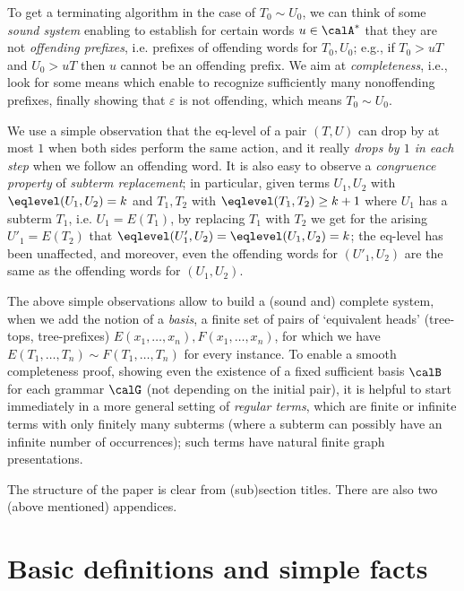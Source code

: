 \documentclass[12pt]{article}
\begin{document}
To get a
terminating algorithm in the case of $T_0\sim U_0$,
we can think of some \emph{sound system} enabling to establish for certain words
$u\in\calA^*$ that they are not \emph{offending prefixes}, i.e.
prefixes of offending words for  $T_0,U_0$; e.g., if $T_0\gt{u} T$
and $U_0\gt{u} T$ then $u$ cannot be an offending prefix.
We aim at \emph{completeness},
i.e., look for some means which enable to recognize sufficiently many
nonoffending prefixes, finally showing that $\varepsilon$ is not
offending, which means  $T_0\sim U_0$.

We use a simple observation that
the eq-level of a pair $(T,U)$ can drop by at most $1$ when both sides
perform the same
action, 
and it 
really \emph{drops by $1$ in each step} when we follow an offending
word.
It is also easy to observe a \emph{congruence property} of
\emph{subterm replacement}; in particular, given terms $U_1,U_2$ with 
$\eqlevel(U_1,U_2)=k$ and $T_1,T_2$ with  $\eqlevel(T_1,T_2)\geq k+1$
where $U_1$ has a subterm $T_1$, i.e. $U_1=E(T_1)$,
by replacing $T_1$ with $T_2$ we get for the arising $U'_1=E(T_2)$ 
that $\eqlevel(U'_1,U_2)=\eqlevel(U_1,U_2)=k$; 
the eq-level has been unaffected, and moreover, even the offending words for
$(U'_1,U_2)$ 
are
the same as the offending words for $(U_1,U_2)$. 

The above simple observations allow to build a (sound and) 
complete system,
when we add the notion of a \emph{basis}, a finite set of pairs of `equivalent heads'
(tree-tops, tree-prefixes)
$E(x_1,\dots,x_n), F(x_1,\dots,x_n)$, for which 
we have $E(T_1,\dots,T_n)\sim F(T_1,\dots,T_n)$ for every instance.
To enable a smooth completeness proof, showing
even the existence of a fixed sufficient basis
$\calB$ for each grammar $\calG$ (not depending on the initial pair),
it is helpful
to start immediately in a more general setting of
\emph{regular terms}, 
which are finite or infinite terms with only finitely many
subterms (where a subterm can possibly have an infinite number of
occurrences); such terms have natural finite graph presentations.


The structure of the paper is clear from (sub)section titles.
There are also two (above mentioned) appendices.




\section{Basic definitions and simple facts}
\label{sec:definitions}
\end{document}
